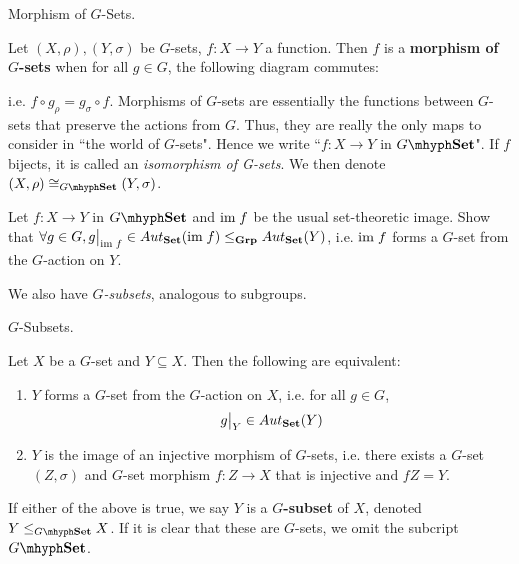 \documentclass[../../book.tex]{subfiles}
\begin{document}
\begin{dfn} Morphism of $G$-Sets. 

    Let $(X,\rho), (Y,\sigma)$ be $G$-sets, $f : X \to Y$ a function. 
    Then $f$ is a \textbf{morphism of $G$-sets} when for all $g \in G$,
    the following diagram commutes: 
    \begin{figure}[H]
        \centering
    \end{figure}
    i.e. $f \circ g_\rho = g_\sigma \circ f$. 
    Morphisms of $G$-sets are essentially 
    the functions between $G$-sets that preserve the actions from $G$. 
    Thus, they are really the only maps to consider in ``the world of $G$-sets".
    Hence we write ``$f : X \to Y$ in $G\mhyph\Set$". 
    If $f$ bijects, it is called an \emph{isomorphism of G-sets}. 
    We then denote $(X,\rho) \iso_{G\mhyph\Set} (Y,\sigma)$. 
    
\end{dfn}

\begin{ex}
    
    Let $f : X \to Y$ in $G\mhyph\Set$ and $\textnormal{im}\; f$ be the usual set-theoretic image.
    Show that $\forall g \in G, 
    \res{g}{\im  f} \in Aut_\Set(\im  f) \leq_\Grp Aut_\Set(Y)$,
    i.e. $\textnormal{im}\; f$ forms a $G$-set from the $G$-action on $Y$.  
\end{ex}

We also have \emph{$G$-subsets}, analogous to subgroups. 

\begin{dfn} $G$-Subsets.
    
    Let $X$ be a $G$-set and $Y \subseteq X$. 
    Then the following are equivalent: 
    \begin{enumerate}
        \item $Y$ forms a $G$-set from the $G$-action on $X$, 
        i.e. for all $g \in G$, \[\res{g}{Y} \in Aut_\Set(Y)\]
        \item $Y$ is the image of an injective morphism of $G$-sets, 
        i.e. there exists a $G$-set $(Z,\sigma)$ and $G$-set morphism $f : Z \to X$
        that is injective and $fZ = Y$. 
    \end{enumerate}
    If either of the above is true, 
    we say $Y$ is a \textbf{$G$-subset} of $X$,
    denoted $Y \leq_{G\mhyph\Set} X$. 
    If it is clear that these are $G$-sets, 
    we omit the subcript $G\mhyph\Set$.
    
\end{dfn}
\end{document}
